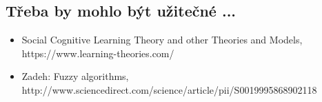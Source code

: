 \documentclass[a4paper,10pt]{article}
\begin{document}
\subsection{Třeba by mohlo být užitečné ...}
\begin{itemize}
 \item Social Cognitive Learning Theory and other Theories and Models, https://www.learning-theories.com/
 \item Zadeh: Fuzzy algorithms, http://www.sciencedirect.com/science/article/pii/S0019995868902118
\end{itemize}

\newpage


\end{document}
